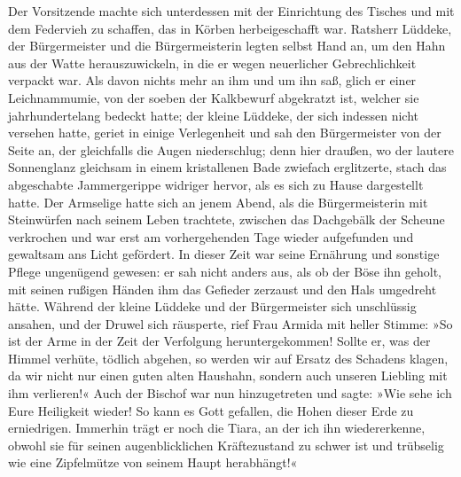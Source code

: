 Der Vorsitzende machte sich unterdessen mit der Einrichtung des
Tisches und mit dem Federvieh zu schaffen, das in Körben
herbeigeschafft war. Ratsherr Lüddeke, der Bürgermeister und die
Bürgermeisterin legten selbst Hand an, um den Hahn aus der Watte
herauszuwickeln, in die er wegen neuerlicher Gebrechlichkeit
verpackt war. Als davon nichts mehr an ihm und um ihn saß, glich er
einer Leichnammumie, von der soeben der Kalkbewurf abgekratzt ist,
welcher \pagenum{[46]} sie jahrhundertelang bedeckt hatte; der
kleine Lüddeke, der sich indessen nicht versehen hatte, geriet in
einige Verlegenheit und sah den Bürgermeister von der Seite an, der
gleichfalls die Augen niederschlug; denn hier draußen, wo der
lautere Sonnenglanz gleichsam in einem kristallenen Bade zwiefach
erglitzerte, stach das abgeschabte Jammergerippe widriger hervor,
als es sich zu Hause dargestellt hatte. Der Armselige hatte sich an
jenem Abend, als die Bürgermeisterin mit Steinwürfen nach seinem
Leben trachtete, zwischen das Dachgebälk der Scheune verkrochen und
war erst am vorhergehenden Tage wieder aufgefunden und gewaltsam
ans Licht gefördert. In dieser Zeit war seine Ernährung und
sonstige Pflege ungenügend gewesen: er sah nicht anders aus, als ob
der Böse ihn geholt, mit seinen rußigen Händen ihm das Gefieder
zerzaust und den Hals umgedreht hätte. Während der kleine Lüddeke
und der Bürgermeister sich unschlüssig ansahen, und der Druwel sich
räusperte, rief Frau Armida mit heller Stimme: »So ist der Arme in
der Zeit der Verfolgung heruntergekommen! Sollte er, was der Himmel
verhüte, tödlich abgehen, so werden wir auf Ersatz des Schadens
klagen, da wir nicht nur einen guten alten Haushahn, sondern auch
unseren Liebling mit ihm verlieren!« Auch der Bischof war nun
hinzugetreten und sagte: »Wie sehe ich Eure Heiligkeit wieder! So
kann es Gott gefallen, die Hohen dieser Erde zu erniedrigen.
Immerhin trägt er noch die Tiara, an der ich ihn wiedererkenne,
obwohl sie für seinen augenblicklichen Kräftezustand zu schwer ist
und trübselig wie eine Zipfelmütze von seinem Haupt herabhängt!«

